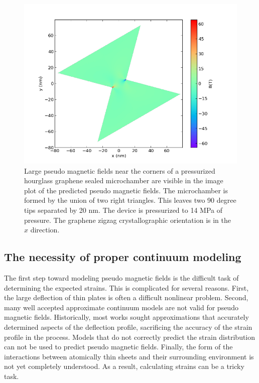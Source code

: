 \begin{figure} 
  \begin{center}
  \includegraphics[scale=.75]{Figs_PVP/HourGlass_PMF.png}
  \end{center}
  \caption[Large pseudo magnetic fields near the corners of a pressurized hourglass graphene sealed microchamber]{\label{fig:PVP:hourglass_PMF} Large pseudo magnetic fields near the corners of a pressurized hourglass graphene sealed microchamber are visible in the image plot of the predicted pseudo magnetic fields. The microchamber is formed by the union of two right triangles. This leaves two 90 degree tips separated by 20 nm. The device is pressurized to 14 MPa of pressure. The graphene zigzag crystallographic orientation is in the $\hat{x}$ direction.}
\end{figure}

\subsection{The necessity of proper continuum modeling\label{sec:PVP:GoodCont}}
The first step toward modeling pseudo magnetic fields is the difficult task of determining the expected strains.
This is complicated for several reasons.
First, the large deflection of thin plates is often a difficult nonlinear problem.
Second, many well accepted approximate continuum models are not valid for pseudo magnetic fields.
Historically, most works sought approximations that accurately determined aspects of the deflection profile, sacrificing the accuracy of the strain profile in the process.
Models that do not correctly predict the strain distribution can not be used to predict pseudo magnetic fields.
Finally, the form of the interactions between atomically thin sheets and their surrounding environment is not yet completely understood.
As a result, calculating strains can be a tricky task.

